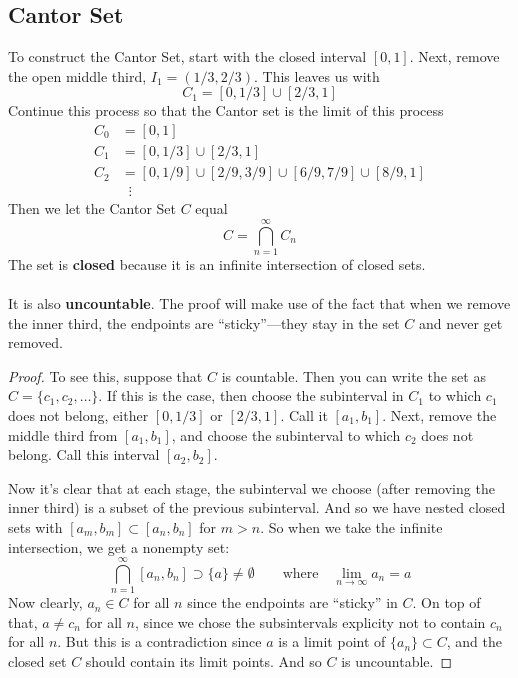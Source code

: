 \documentclass[12pt]{article}
\theoremstyle{plain}
\theoremstyle{definition}
\theoremstyle{remark}
\begin{document}
\subsection{Cantor Set}

To construct the Cantor Set, start with the closed interval $[0,1]$. Next, remove the open middle third, $I_1 = (1/3, 2/3)$. This leaves us with 
    \[ C_1 = [0, 1/3] \cup [2/3, 1] \]
Continue this process so that the Cantor set is the limit of this process
\begin{align*}
    C_0 &= [0,1] \\
    C_1 &= [0,1/3] \cup [2/3, 1] \\
    C_2 &= [0,1/9] \cup [2/9, 3/9]  \cup [6/9, 7/9] \cup [8/9, 1]
        \\
    &\;\;\vdots 
\end{align*}
Then we let the Cantor Set $C$ equal
    \[ C = \bigcap^\infty_{n=1} C_n \]
    The set is \textbf{closed} because it is an infinite intersection of closed sets.
\\
\\
It is also \textbf{uncountable}. The proof will make use of the fact that when we remove the inner third, the endpoints are ``sticky''---they stay in the set $C$ and never get removed.
\begin{proof}
To see this, suppose that $C$ is countable. Then you can write the set as $C = \{c_1, c_2, \ldots\}$. If this is the case, then choose the subinterval in $C_1$ to which $c_1$ does not belong, either $[0,1/3]$ or $[2/3,1]$. Call it $[a_1, b_1]$. Next, remove the middle third from $[a_1, b_1]$, and choose the subinterval to which $c_2$ does not belong. Call this interval $[a_2, b_2]$. 

Now it's clear that at each stage, the subinterval we choose (after removing the inner third) is a subset of the previous subinterval. And so we have nested closed sets with $[a_m, b_m] \subset [a_n, b_n]$ for $m>n$. So when we take the infinite intersection, we get a nonempty set:
\[ 
    \bigcap^\infty_{n=1} [a_n, b_n] \supset \{a\} \neq 
    \emptyset\qquad \text{where} \quad 
    \lim_{n\rightarrow\infty} a_n = a
\]
Now clearly, $a_n\in C$ for all $n$ since the endpoints are ``sticky'' in $C$.  On top of that, $a\neq c_n$ for all $n$, since we chose the subsintervals explicity not to contain $c_n$ for all $n$.  But this is a contradiction since $a$ is a limit point of $\{a_n\}\subset C$, and the closed set $C$ should contain its limit points. And so $C$ is uncountable.
\end{proof}
\end{document}

